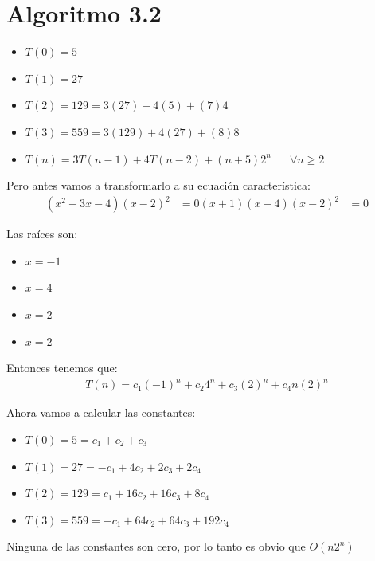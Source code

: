 \documentclass[12pt, fleqn]{article}                            %
\DeclareMathOperator \Space {\quad}                             %
\theoremstyle{break}                                            %
\begin{document}
    \section{Algoritmo 3.2}

        \begin{itemize}
            \item $T(0) = 5$
            \item $T(1) = 27$
            \item $T(2) = 129 = 3(27) + 4(5) + (7)4$
            \item $T(3) = 559 = 3(129) + 4(27) + (8)8$
            \item $T(n) = 3T(n - 1) + 4T(n - 2) + (n + 5)2^n \Space \forall n \geq 2$
        \end{itemize}

        Pero antes vamos a transformarlo a su ecuación característica:
        \begin{align*}
            (x^2 - 3x - 4)(x - 2)^2 &= 0
            (x + 1)(x - 4)(x - 2)^2 &= 0
        \end{align*}

        Las raíces son:
        \begin{itemize}
            \item $x = -1$
            \item $x = 4$
            \item $x = 2$
            \item $x = 2$
        \end{itemize}

        Entonces tenemos que:
        \begin{align*}
            T(n) = c_1(-1)^n + c_2 4^n + c_3(2)^n + c_4 n(2)^n
        \end{align*}

        Ahora vamos a calcular las constantes:
        \begin{itemize}
            \item $T(0) = 5 = c_1 + c_2 + c_3$
            \item $T(1) = 27 = -c_1 + 4c_2 + 2c_3 + 2c_4$
            \item $T(2) = 129 = c_1 + 16c_2 + 16c_3 + 8c_4$
            \item $T(3) = 559 = -c_1 + 64c_2 + 64c_3 + 192c_4$
        \end{itemize}

        Ninguna de las constantes son cero, por lo tanto es obvio que $O(n2^n)$
\end{document}
